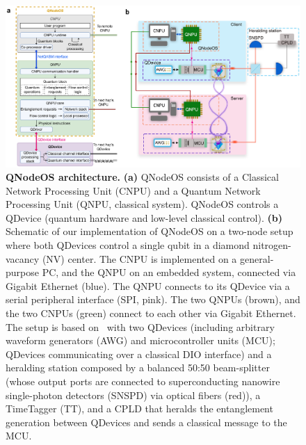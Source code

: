 \begin{figure}[htb]
\centering
\includegraphics[width=1\linewidth]{figures/qnodeos/main/fig2/fig2.png}
\caption{\textbf{QNodeOS architecture.}
\textbf{(a)}
QNodeOS consists of a Classical Network Processing Unit (CNPU) and a Quantum Network Processing Unit (QNPU, classical system).
QNodeOS controls a QDevice (quantum hardware and low-level classical control).
\textbf{(b)}
Schematic of our implementation of QNodeOS on a two-node setup where both QDevices control a single qubit in a diamond nitrogen-vacancy (NV) center.
The CNPU is implemented on a general-purpose PC, and the QNPU on an embedded system, connected via Gigabit Ethernet (blue).
The QNPU connects to its QDevice via a serial peripheral interface (SPI, pink).
The two QNPUs (brown), and the two CNPUs (green) connect to each other via Gigabit Ethernet.
The setup is based on~\cite{pompili_2022_experimental} with two QDevices (including arbitrary waveform generators (AWG) and microcontroller units (MCU); QDevices communicating over a classical DIO interface) and a heralding station composed by a balanced 50:50 beam-splitter (whose output ports are connected to superconducting nanowire single-photon detectors (SNSPD) via optical fibers (red)), a TimeTagger (TT), and a \acf{CPLD} that heralds the entanglement generation between QDevices and sends a classical message to the MCU.}
\label{qnodeos:fig:fig2}
\end{figure}

